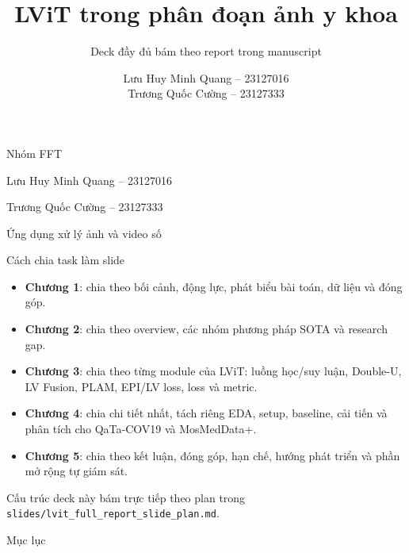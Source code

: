 \documentclass[aspectratio=169,11pt]{beamer}
\title[LViT full report]{LViT trong phân đoạn ảnh y khoa}
\subtitle{Deck đầy đủ bám theo report trong manuscript}
\author[FFT]{\texorpdfstring{Lưu Huy Minh Quang -- 23127016\\Trương Quốc Cường -- 23127333}{FFT}}
\institute[HCMUS]{Nhóm FFT -- Trường Đại học Khoa học Tự nhiên, ĐHQG-HCM}
\date{}
\newcommand{\smallnote}[1]{%
  \par
  \vspace{0.08cm}
  {\footnotesize\color{ink}#1\par}
}
\begin{document}
\begin{frame}[plain]
  \centering
  \vspace{0.9cm}
  \vspace{0.35cm}
  {\large Nhóm FFT\par}
  \vspace{0.12cm}
  {\large Lưu Huy Minh Quang -- 23127016\par}
  \vspace{0.12cm}
  {\large Trương Quốc Cường -- 23127333\par}
  \vspace{0.18cm}
  {\normalsize Ứng dụng xử lý ảnh và video số\par}
\end{frame}

\begin{frame}{Cách chia task làm slide}
  \begin{itemize}
    \item \textbf{Chương 1}: chia theo bối cảnh, động lực, phát biểu bài toán, dữ liệu và đóng góp.
    \item \textbf{Chương 2}: chia theo overview, các nhóm phương pháp SOTA và research gap.
    \item \textbf{Chương 3}: chia theo từng module của LViT: luồng học/suy luận, Double-U, LV Fusion, PLAM, EPI/LV loss, loss và metric.
    \item \textbf{Chương 4}: chia chi tiết nhất, tách riêng EDA, setup, baseline, cải tiến và phân tích cho QaTa-COV19 và MosMedData+.
    \item \textbf{Chương 5}: chia theo kết luận, đóng góp, hạn chế, hướng phát triển và phần mở rộng tự giám sát.
  \end{itemize}
  \smallnote{Cấu trúc deck này bám trực tiếp theo plan trong \texttt{slides/lvit\_full\_report\_slide\_plan.md}.}
\end{frame}

\begin{frame}{Mục lục}
  \tableofcontents
\end{frame}
\end{document}
